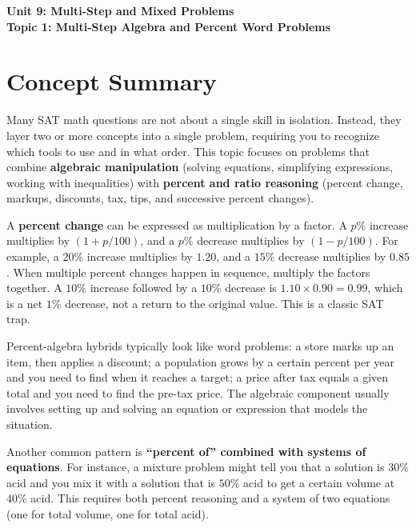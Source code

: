 \documentclass[14pt]{extarticle}
\begin{document}
\raggedright
{}

\begin{center}
    \LARGE \textbf{Unit 9: Multi-Step and Mixed Problems} \\[6pt]
    \Large \textbf{Topic 1: Multi-Step Algebra and Percent Word Problems}
\end{center}

\vspace{1em}

\section*{Concept Summary}

Many SAT math questions are not about a single skill in isolation. Instead, they layer two or more concepts into a single problem, requiring you to recognize which tools to use and in what order. This topic focuses on problems that combine \textbf{algebraic manipulation} (solving equations, simplifying expressions, working with inequalities) with \textbf{percent and ratio reasoning} (percent change, markups, discounts, tax, tips, and successive percent changes).

A \textbf{percent change} can be expressed as multiplication by a factor. A \(p\%\) increase multiplies by \((1 + p/100)\), and a \(p\%\) decrease multiplies by \((1 - p/100)\). For example, a \(20\%\) increase multiplies by \(1.20\), and a \(15\%\) decrease multiplies by \(0.85\). When multiple percent changes happen in sequence, multiply the factors together. A \(10\%\) increase followed by a \(10\%\) decrease is \(1.10 \times 0.90 = 0.99\), which is a net \(1\%\) decrease, not a return to the original value. This is a classic SAT trap.

Percent-algebra hybrids typically look like word problems: a store marks up an item, then applies a discount; a population grows by a certain percent per year and you need to find when it reaches a target; a price after tax equals a given total and you need to find the pre-tax price. The algebraic component usually involves setting up and solving an equation or expression that models the situation.

Another common pattern is \textbf{``percent of'' combined with systems of equations}. For instance, a mixture problem might tell you that a solution is \(30\%\) acid and you mix it with a solution that is \(50\%\) acid to get a certain volume at \(40\%\) acid. This requires both percent reasoning and a system of two equations (one for total volume, one for total acid).
\end{document}
